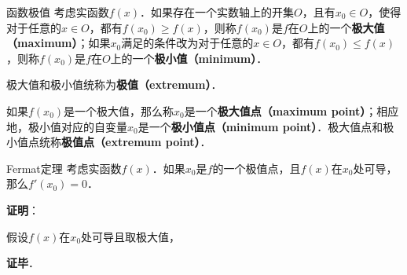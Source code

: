 

\begin{definition}{函数极值}
考虑实函数$f(x)$．如果存在一个实数轴上的开集$O$，且有$x_0\in O$，使得对于任意的$x\in O$，都有$f(x_0)\geq f(x)$，则称$f(x_0)$是$f$在$O$上的一个\textbf{极大值（maximum）}；如果$x_0$满足的条件改为对于任意的$x\in O$，都有$f(x_0)\leq f(x)$，则称$f(x_0)$是$f$在$O$上的一个\textbf{极小值（minimum）}．

极大值和极小值统称为\textbf{极值（extremum）}．

如果$f(x_0)$是一个极大值，那么称$x_0$是一个\textbf{极大值点（maximum point）}；相应地，极小值对应的自变量$x_0$是一个\textbf{极小值点（minimum point）}．极大值点和极小值点统称\textbf{极值点（extremum point）}．
\end{definition}

\begin{theorem}{Fermat定理}
考虑实函数$f(x)$．如果$x_0$是$f$的一个极值点，且$f(x)$在$x_0$处可导，那么$f'(x_0)=0$．
\end{theorem}

\textbf{证明}：

假设$f(x)$在$x_0$处可导且取极大值，

\textbf{证毕}．











